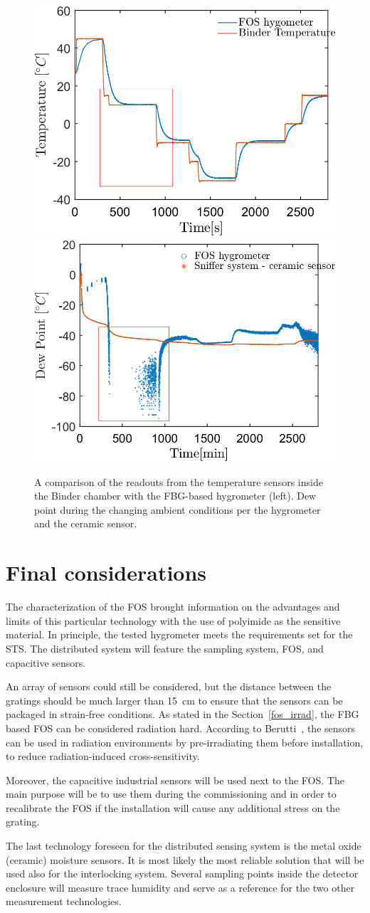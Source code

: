 \begin{figure}[!h]
\centering
\includegraphics[width=0.47\columnwidth]{Chapter5/images/FOS_performance_T.png}
\includegraphics[width=0.49\columnwidth]{Chapter5/images/FOS_performance1.png}
\caption{A comparison of the readouts from the temperature sensors inside the Binder chamber with the \gls{FBG}-based hygrometer (left). Dew point during the changing ambient conditions per the hygrometer and the ceramic sensor.}
\label{Tfig_comparison_2}
\end{figure}
\newpage
\section{Final considerations}

The characterization of the \gls{FOS} brought information on the advantages and limits of this particular technology with the use of polyimide as the sensitive material. In principle, the tested hygrometer meets the requirements set for the \gls{STS}. The distributed system will feature the sampling system, \gls{FOS}, and capacitive sensors.

An array of sensors could still be considered, but the distance between the gratings should be much larger than \SI{15}{\cm} to ensure that the sensors can be packaged in strain-free conditions. As stated in the Section~\ref{fos_irrad}, the \gls{FBG} based \gls{FOS} can be considered radiation hard. According to Berutti~\cite{Berruti}, the sensors can be used in radiation environments by pre-irradiating them before installation, to reduce radiation-induced cross-sensitivity. 

Moreover, the capacitive industrial sensors will be used next to the \gls{FOS}. The main purpose will be to use them during the commissioning and in order to recalibrate the \gls{FOS} if the installation will cause any additional stress on the grating.

The last technology foreseen for the distributed sensing system is the metal oxide (ceramic) moisture sensors. It is most likely the most reliable solution that will be used also for the interlocking system. Several sampling points inside the detector enclosure will measure trace humidity and serve as a reference for the two other measurement technologies.